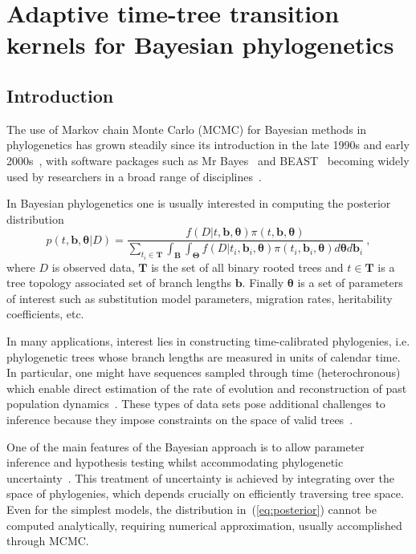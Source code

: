 \chapter{Adaptive time-tree transition kernels for Bayesian phylogenetics}

\section{Introduction}	
\label{sec:intro}

The use of Markov chain Monte Carlo (MCMC) for Bayesian methods in phylogenetics has grown steadily since its introduction in the late 1990s and early 2000s~\citep{Rannala1996, Yang1997, Mau1999, Li2000}, with software packages such as Mr Bayes~\citep{Ronquist2012} and BEAST~\citep{Drummond2012} becoming widely used by researchers in a broad range of disciplines~\citep{Murphy2001, Bouckaert2012, Lemey2014}.

In Bayesian phylogenetics one is usually interested in computing the posterior distribution
\begin{equation}
\label{eq:posterior}
 p(t, \boldsymbol b, \boldsymbol \theta | D) = \frac{f(D | t, \boldsymbol b, \boldsymbol \theta ) \pi(t, \boldsymbol b, \boldsymbol \theta )}{\sum_{t_i \in \boldsymbol T} \int_{\boldsymbol B}\int_{\boldsymbol \Theta} f(D | t_i, \boldsymbol b_i, \boldsymbol \theta ) \pi(t_i, \boldsymbol b_i, \boldsymbol \theta ) d\boldsymbol\theta d\boldsymbol b_i}\:,
\end{equation}
where $D$ is observed data, $\boldsymbol T$ is the set of all binary rooted trees and $t \in \boldsymbol T$  is a tree topology associated set of branch lengths $\boldsymbol b$.
Finally $\boldsymbol \theta$ is a set of parameters of interest such as substitution model parameters, migration rates, heritability coefficients, etc.

In many applications, interest lies in constructing time-calibrated phylogenies, i.e. phylogenetic trees whose branch lengths are measured in units of calendar time.
In particular, one might have sequences sampled through time (heterochronous) which enable direct estimation of the rate of evolution and reconstruction of past population dynamics~\citep{Drummond2002, Drummond2005}.
These types of data sets pose additional challenges to inference because they impose constraints on the space of valid trees~\citep{Stadler2013}.

One of the main features of the Bayesian  approach is to  allow parameter inference and hypothesis testing whilst accommodating phylogenetic uncertainty~\citep{Suchard2001, Huelsenbeck2002}.
This treatment of uncertainty is achieved by integrating over the space of phylogenies, which depends crucially on efficiently traversing tree space.
Even for the simplest models, the distribution in~(\ref{eq:posterior}) cannot be computed analytically, requiring numerical approximation, usually  accomplished through MCMC.

